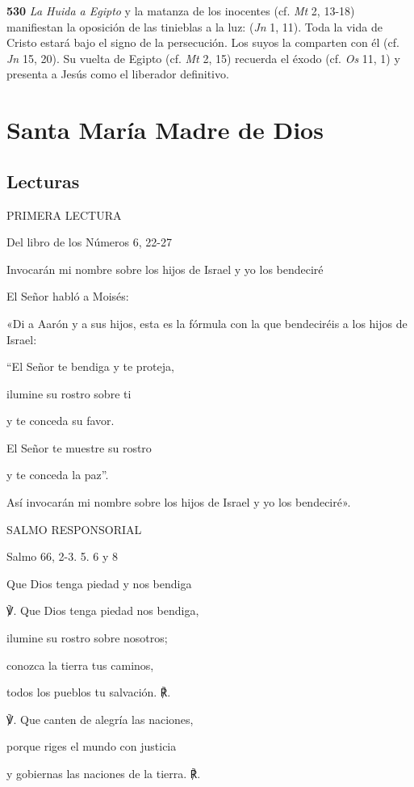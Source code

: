 \begin{body}
\begin{body}
\textbf{530} \emph{La Huida a Egipto} y la matanza de los inocentes (cf. \emph{Mt} 2, 13-18) manifiestan la oposición de las tinieblas a la luz:  (\emph{Jn} 1, 11). Toda la vida de Cristo estará bajo el signo de la persecución. Los suyos la comparten con él (cf. \emph{Jn} 15, 20). Su vuelta de Egipto (cf. \emph{Mt} 2, 15) recuerda el éxodo (cf. \emph{Os} 11, 1) y presenta a Jesús como el liberador definitivo.



\chapter{Santa María Madre de Dios}

\section{Lecturas}

PRIMERA LECTURA

Del libro de los Números 6, 22-27

Invocarán mi nombre sobre los hijos de Israel y yo los bendeciré

El Señor habló a Moisés:

«Di a Aarón y a sus hijos, esta es la fórmula con la que bendeciréis a
los hijos de Israel:

``El Señor te bendiga y te proteja,

ilumine su rostro sobre ti

y te conceda su favor.

El Señor te muestre su rostro

y te conceda la paz''.

Así invocarán mi nombre sobre los hijos de Israel y yo los bendeciré».

SALMO RESPONSORIAL

Salmo 66, 2-3. 5. 6 y 8

Que Dios tenga piedad y nos bendiga

℣. Que Dios tenga piedad nos bendiga,

ilumine su rostro sobre nosotros;

conozca la tierra tus caminos,

todos los pueblos tu salvación. ℟.

℣. Que canten de alegría las naciones,

porque riges el mundo con justicia

y gobiernas las naciones de la tierra. ℟.


\end{body}
\end{body}
